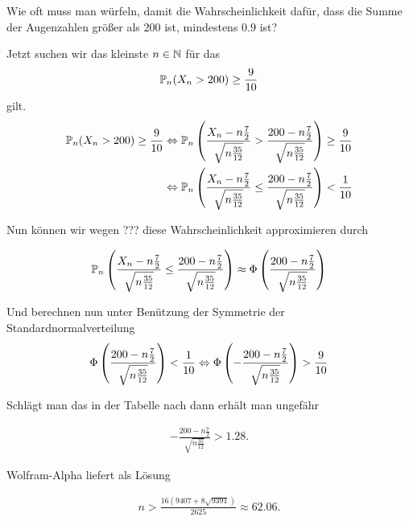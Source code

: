\begin{exercise}

Wie oft muss man würfeln, damit die Wahrscheinlichkeit dafür, dass die Summe der Augenzahlen größer als $200$ ist, mindestens $0.9$ ist?

\end{exercise}

\begin{solution}

Jetzt suchen wir das kleinste $n \in \N$ für das
\begin{align*}
    \P_n(X_n > 200) \geq \frac{9}{10}
\end{align*}
gilt.
\begin{align*}
    \P_n(X_n > 200) \geq \frac{9}{10} &\Leftrightarrow \P_n\pbraces{\frac{X_n-n\frac{7}{2}}{\sqrt{n\frac{35}{12}}} > \frac{200 -n\frac{7}{2}}{\sqrt{n\frac{35}{12}}}} \geq \frac{9}{10} \\
    &\Leftrightarrow \P_n\pbraces{\frac{X_n-n\frac{7}{2}}{\sqrt{n\frac{35}{12}}} \leq \frac{200 -n\frac{7}{2}}{\sqrt{n\frac{35}{12}}}} < \frac{1}{10}
\end{align*}

Nun können wir wegen ??? diese Wahrscheinlichkeit approximieren durch

\begin{align*}
    \P_n\pbraces{\frac{X_n-n\frac{7}{2}}{\sqrt{n\frac{35}{12}}} \leq \frac{200 -n\frac{7}{2}}{\sqrt{n\frac{35}{12}}}} \approx \Phi\pbraces{\frac{200 -n\frac{7}{2}}{\sqrt{n\frac{35}{12}}}}
\end{align*}

Und berechnen nun unter Benützung der Symmetrie der Standardnormalverteilung
\begin{align*}
    \Phi\pbraces{\frac{200 -n\frac{7}{2}}{\sqrt{n\frac{35}{12}}}} < \frac{1}{10} \Leftrightarrow \Phi\pbraces{-\frac{200 -n\frac{7}{2}}{\sqrt{n\frac{35}{12}}}} > \frac{9}{10}
\end{align*}

Schlägt man das in der Tabelle nach dann erhält man ungefähr

\begin{align*}
    -\frac{200 -n\frac{7}{2}}{\sqrt{n\frac{35}{12}}} > 1.28.
\end{align*}

Wolfram-Alpha liefert als Lösung

\begin{align*}
    n > \frac{16(9407+8\sqrt{9391})}{2625} \approx 62.06.
\end{align*}

\end{solution}

